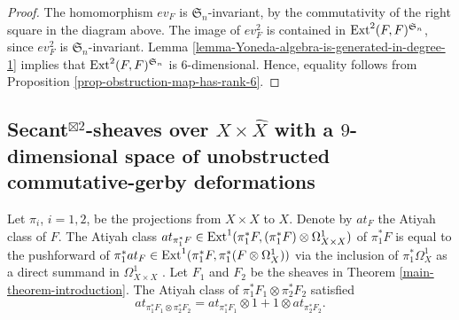 \documentclass[12pt]{amsart}
\numberwithin{equation}{subsection}
\theoremstyle{plain}
\theoremstyle{definition}
\newcommand{\fS}{{\mathfrak S}}
\newcommand{\Ext}{{\rm Ext}}
\begin{document}
{\begin{proof}
The homomorphism $ev_F$ is $\fS_n$-invariant, by the commutativity of the right square in the diagram above.
The image of $ev^2_F$ is contained in $\Ext^2(F,F)^{\fS_n}$, since $ev^2_F$ is $\fS_n$-invariant. 
Lemma \ref{lemma-Yoneda-algebra-is-generated-in-degree-1} implies that $\Ext^2(F,F)^{\fS_n}$ is $6$-dimensional. Hence, equality follows from Proposition \ref{prop-obstruction-map-has-rank-6}.
\end{proof}

}


% 
\subsection{Secant$^{\boxtimes 2}$-sheaves over $X\times\hat{X}$ with 
a $9$-dimensional space of unobstructed commutative-gerby deformations}
\label{sec-ob-E}
Let $\pi_i$, $i=1,2$, be the projections from $X\times X$ to $X$. Denote by $at_F$ the Atiyah class of $F$.
The Atiyah class $at_{\pi_1^*F}\in \Ext^1(\pi_1^*F,(\pi_1^*F)\otimes \Omega^1_{X\times X})$ of $\pi_1^*F$ is equal to the pushforward of $\pi_1^*at_F\in \Ext^1(\pi_1^*F,\pi_1^*(F\otimes\Omega^1_X))$ via the inclusion of $\pi_1^*\Omega^1_X$ as a direct summand in $\Omega^1_{X\times X}$ \cite[Prop. 3.14]{buchweitz-flenner}. Let $F_1$ and $F_2$ be the sheaves in Theorem \ref{main-theorem-introduction}.
The Atiyah class of $\pi_1^*F_1\otimes\pi_2^*F_2$ satisfied 
\begin{equation}
\label{eq-decomposition-of-atyah-class-of-secant-square-sheaf}
at_{\pi_1^*F_1\otimes\pi_2^*F_2}=at_{\pi_1^*F_1}\otimes 1+1\otimes at_{\pi_2^*F_2}.
\end{equation}
\end{document}
